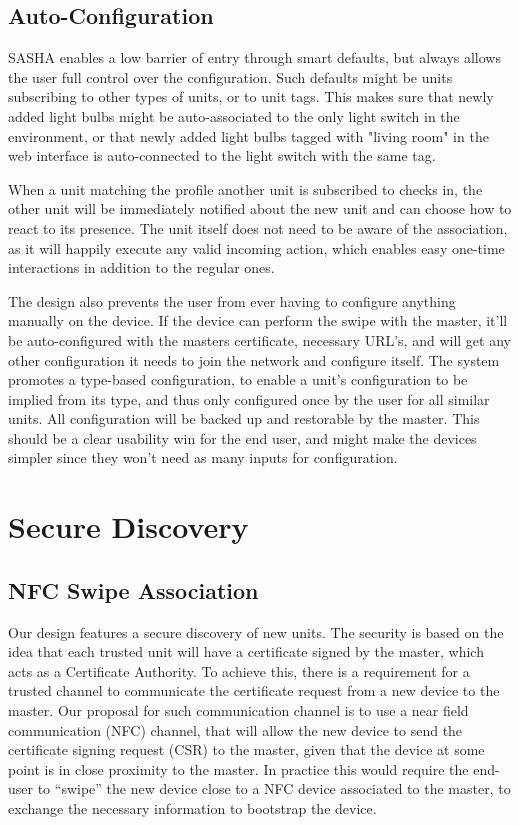 \subsection{Auto-Configuration}
SASHA enables a low barrier of entry through smart defaults, but always allows the user full control over the configuration. Such defaults might be units subscribing to other types of units, or to unit tags. This makes sure that newly added light bulbs might be auto-associated to the only light switch in the environment, or that newly added light bulbs tagged with "living room" in the web interface is auto-connected to the light switch with the same tag.

When a unit matching the profile another unit is subscribed to checks in, the other unit will be immediately notified about the new unit and can choose how to react to its presence. The unit itself does not need to be aware of the association, as it will happily execute any valid incoming action, which enables easy one-time interactions in addition to the regular ones.

The design also prevents the user from ever having to configure anything manually on the device. If the device can perform the swipe with the master, it'll be auto-configured with the masters certificate, necessary URL’s, and will get any other configuration it needs to join the network and configure itself. The system promotes a type-based configuration, to enable a unit's configuration to be implied from its type, and thus only configured once by the user for all similar units. All configuration will be backed up and restorable by the master. This should be a clear usability win for the end user, and might make the devices simpler since they won't need as many inputs for configuration.


\section{Secure Discovery}
\subsection{NFC Swipe Association}
Our design features a secure discovery of new units. The security is based on the idea that each trusted unit will have a certificate signed by the master, which acts as a Certificate Authority. To achieve this, there is a requirement for a trusted channel to communicate the certificate request from a new device to the master. Our proposal for such communication channel is to use a near field communication (NFC) channel, that will allow the new device to send the certificate signing request (CSR) to the master, given that the device at some point is in close proximity to the master. In practice this would require the end-user to “swipe” the new device close to a NFC device associated to the master, to exchange the necessary information to bootstrap the device.

